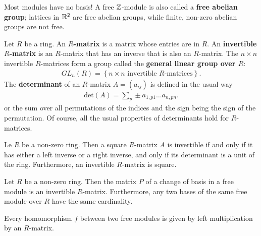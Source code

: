 \documentclass{memoir}
\begin{document}
\begin{exmp}
Most modules have no basis! A free \(\mathbb{Z}\)-module is also called a \textbf{free abelian group}; lattices in \(\mathbb{R}^2\) are free abelian groups, while finite, non-zero abelian groups are not free.
\end{exmp}

\begin{defn}[R-Matrix]
	Let \(R\) be a ring. An \textbf{\(R\)-matrix} is a matrix whose entries are in \(R\). An \textbf{invertible \(R\)-matrix} is an \(R\)-matrix that has an inverse that is also an \(R\)-matrix. The \(n \times n\) invertible \(R\)-matrices form a group called the \textbf{general linear group over \(R\)}:
	\begin{align*}
		GL_n(R) = \left\{n\times n \text{ invertible \(R\)-matrices} \right\} .
	\end{align*}
	The \textbf{determinant} of an \(R\)-matrix \(A = (a_{ij})\) is defined in the usual way
	\begin{align*}
		\textrm{det}(A) = \sum_{p} \pm a_{1,p 1}\ldots a_{n, pn}.
	\end{align*}
	or the sum over all permutations of the indices and the sign being the sign of the permutation. Of course, all the usual properties of determinants hold for \(R\)-matrices.
\end{defn}

\begin{lemma}
	Le \(R\) be a non-zero ring. Then a square \(R\)-matrix \(A\) is invertible if and only if it has either a left inverse or a right inverse, and only if its determinant is a unit of the ring. Furthermore, an invertible \(R\)-matrix is square.
\end{lemma}

\begin{prop}
	Let \(R\) be a non-zero ring. Then the matrix \(P\) of a change of basis in a free module is an invertible \(R\)-matrix. Furthermore, any two bases of the same free module over \(R\) have the same cardinality.
\end{prop}
Every homomorphism \(f\) between two free modules is given by left multiplication by an \(R\)-matrix.
\end{document}
